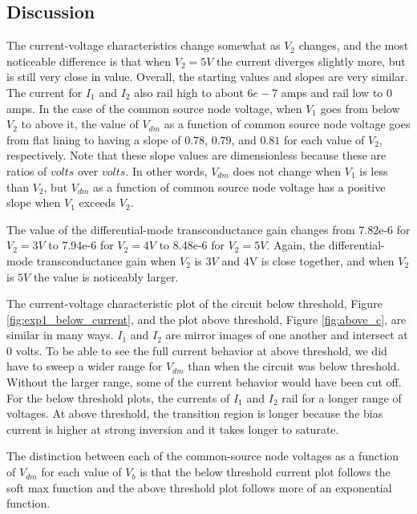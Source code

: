 \documentclass{article}
\begin{document}
\subsection{Discussion}
The current-voltage characteristics change somewhat as $V_2$ changes, and the most noticeable difference is that when $V_2=5V$ the current diverges slightly more, but is still very close in value. Overall, the starting values and slopes are very similar.  The current for $I_{1}$ and $I_{2}$ also rail high to about $6e-7$ amps and rail low to 0 amps.
 In the case of the common source node voltage, when $V_1$ goes from below $V_2$ to above it, the value of $V_{dm}$ as a function of common source node voltage goes from flat lining to having a slope of $0.78$, $0.79$, and $0.81$ for each value of $V_2$, respectively. Note that these slope values are dimensionless because these are ratios of $volts$ over $volts$. In other words, $V_{dm}$ does not change when $V_1$ is less than $V_2$, but $V_{dm}$ as a function of common source node voltage has a positive slope when $V_1$ exceeds $V_2$.
 
The value of the differential-mode transconductance gain changes from 7.82e-6 for $V_2=3V$ to 7.94e-6 for $V_2=4V$ to 8.48e-6 for $V_2=5V$. Again, the differential-mode transconductance gain when $V_2$ is $3V$ and $4$V is close together, and when $V_2$ is $5V$ the value is noticeably larger.

The current-voltage characteristic plot of the circuit below threshold, Figure \ref{fig:exp1_below_current}, and the plot above threshold, Figure \ref{fig:above_c}, are similar in many ways.  $I_{1}$ and $I_{2}$ are mirror images of one another and intersect at 0 volts.  To be able to see the full current behavior at above threshold, we did have to sweep a wider range for $V_{dm}$ than when the circuit was below threshold.  Without the larger range, some of the current behavior would have been cut off. For the below threshold plots, the currents of $I_{1}$ and $I_{2}$ rail for a longer range of voltages.  At above threshold, the transition region is longer because the bias current is higher at strong inversion and it takes longer to saturate.

The distinction between each of the common-source node voltages as a function of $V_{dm}$ for each value of $V_b$ is that the below threshold current plot follows the soft max function and the above threshold plot follows more of an exponential function.
\
\end{document}
